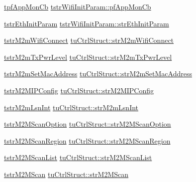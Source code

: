 \begin{DoxyCompactItemize}
\item 
\hyperlink{group__WlanEnums_ga8d2753e870245dad4932cee1777c6eb6}{tpf\+App\+Mon\+Cb} \hyperlink{group__WifiSetCustInfoElementFn_gabbd16bbde19ebb6cea2ff732b84421e8}{tstr\+Wifi\+Init\+Param\+::pf\+App\+Mon\+Cb}
\item 
\hyperlink{structtstrEthInitParam}{tstr\+Eth\+Init\+Param} \hyperlink{group__WifiSetCustInfoElementFn_gac72757e663d13b9c446735a5dca54eb1}{tstr\+Wifi\+Init\+Param\+::str\+Eth\+Init\+Param}
\item 
\hyperlink{structtstrM2mWifiConnect}{tstr\+M2m\+Wifi\+Connect} \hyperlink{group__WifiSetCustInfoElementFn_gad18e734993535e24d55c4c9c68ef5e9e}{tu\+Ctrl\+Struct\+::str\+M2m\+Wifi\+Connect}
\item 
\hyperlink{structtstrM2mTxPwrLevel}{tstr\+M2m\+Tx\+Pwr\+Level} \hyperlink{group__WifiSetCustInfoElementFn_ga6e1c8bb535776890cc43768772bb355c}{tu\+Ctrl\+Struct\+::str\+M2m\+Tx\+Pwr\+Level}
\item 
\hyperlink{structtstrM2mSetMacAddress}{tstr\+M2m\+Set\+Mac\+Address} \hyperlink{group__WifiSetCustInfoElementFn_ga998d3b618d2b3772da329489f07ed147}{tu\+Ctrl\+Struct\+::str\+M2m\+Set\+Mac\+Address}
\item 
\hyperlink{structtstrM2MIPConfig}{tstr\+M2\+M\+I\+P\+Config} \hyperlink{group__WifiSetCustInfoElementFn_ga5a4fa5bbf6f826929f821d083629cabe}{tu\+Ctrl\+Struct\+::str\+M2\+M\+I\+P\+Config}
\item 
\hyperlink{structtstrM2mLsnInt}{tstr\+M2m\+Lsn\+Int} \hyperlink{group__WifiSetCustInfoElementFn_gac81e96a254e43f3e6830cdd041fa27fe}{tu\+Ctrl\+Struct\+::str\+M2m\+Lsn\+Int}
\item 
\hyperlink{structtstrM2MScanOption}{tstr\+M2\+M\+Scan\+Option} \hyperlink{group__WifiSetCustInfoElementFn_ga17a6de03099e43e155df470d334ef7c6}{tu\+Ctrl\+Struct\+::str\+M2\+M\+Scan\+Option}
\item 
\hyperlink{structtstrM2MScanRegion}{tstr\+M2\+M\+Scan\+Region} \hyperlink{group__WifiSetCustInfoElementFn_gaf29f369330e8f80de5437187e43c6502}{tu\+Ctrl\+Struct\+::str\+M2\+M\+Scan\+Region}
\item 
\hyperlink{structtstrM2MScanList}{tstr\+M2\+M\+Scan\+List} \hyperlink{group__WifiSetCustInfoElementFn_ga0307e0f160d77ae850197e3eca817b50}{tu\+Ctrl\+Struct\+::str\+M2\+M\+Scan\+List}
\item 
\hyperlink{structtstrM2MScan}{tstr\+M2\+M\+Scan} \hyperlink{group__WifiSetCustInfoElementFn_gab615602d108737ff25c7032eda516730}{tu\+Ctrl\+Struct\+::str\+M2\+M\+Scan}
\item 

\end{DoxyCompactItemize}
